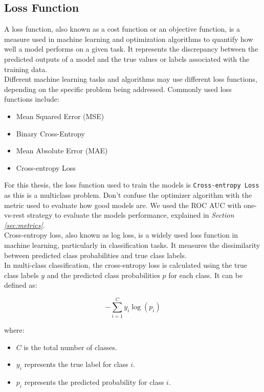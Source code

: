 \subsection{Loss Function}

A loss function, also known as a cost function or an objective function, is a measure used in machine learning and optimization algorithms to quantify how well a model performs on a given task. It represents the discrepancy between the predicted outputs of a model and the true values or labels associated with the training data. \\

Different machine learning tasks and algorithms may use different loss functions, depending on the specific problem being addressed. Commonly used loss functions include:

\begin{itemize}
    \item Mean Squared Error (MSE)
    \item Binary Cross-Entropy
    \item Mean Absolute Error (MAE)
    \item Cross-entropy Loss
\end{itemize}

For this thesis, the loss function used to train the models is
{\tt Cross-entropy Loss} as this is a multiclass problem. Don't confuse the optimizer
algorithm with the metric used to evaluate how good models are.
We used the ROC AUC with one-vs-rest strategy to evaluate the models performance, explained in \textit{Section \ref{sec:metrics}}. \\

Cross-entropy loss, also known as log loss, is a widely used loss function in machine learning, particularly in classification tasks. It measures the dissimilarity between predicted class probabilities and true class labels. \\

In multi-class classification, the cross-entropy loss is calculated using the true class labels \(y\) and the predicted class probabilities \(p\) for each class. It can be defined as:

\[-\sum_{i=1}^{C} y_i \log(p_i)\]

\noindent where:

\begin{itemize}
    \item \(C\) is the total number of classes.
    \item \(y_i\) represents the true label for class \(i\).
    \item \(p_i\) represents the predicted probability for class \(i\).
\end{itemize}

